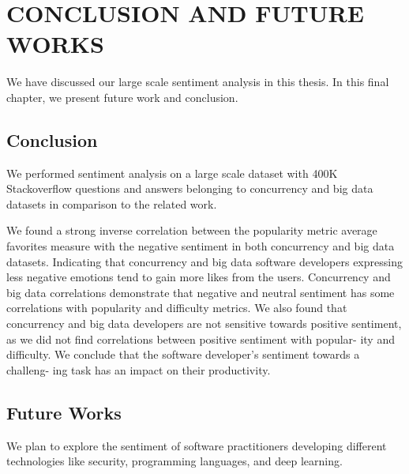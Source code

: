 \chapter{CONCLUSION AND FUTURE WORKS}
We have discussed our large scale sentiment analysis in this thesis. In this final chapter, we present future work and conclusion.

\section{Conclusion}

We performed sentiment analysis on a large scale dataset with 400K Stackoverflow questions and answers belonging to concurrency and big data datasets in comparison to the related work. 

We found a strong inverse correlation between the popularity metric average favorites measure with the negative sentiment in both concurrency and big data datasets. Indicating that concurrency and big data software developers expressing less negative emotions tend to gain more likes from the users. Concurrency and big data correlations demonstrate that negative and neutral sentiment has some correlations with popularity and difficulty metrics. We also found that concurrency and big data developers are not sensitive towards positive sentiment, as we did not find correlations between positive sentiment with popular- ity and difficulty. We conclude that the software developer's sentiment towards a challeng- ing task has an impact on their productivity. 

\section{Future Works}
We plan to explore the sentiment of software practitioners developing different technologies like security, programming languages, and deep learning.
